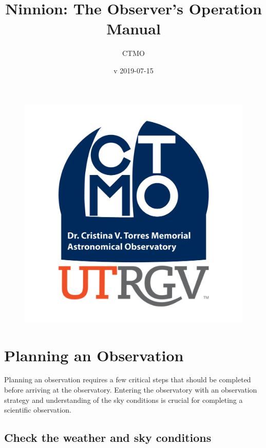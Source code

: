 \documentclass{article}
\title{Ninnion: The Observer's Operation Manual}
\author{CTMO}
\date{v 2019-07-15}
\begin{document}
	
	\maketitle
	
	\begin{figure}[b]
		\centering
		\includegraphics[scale=0.2]{CTMO_transparent.png}
	\end{figure}
	
	\newpage
	\tableofcontents
	
	\newpage
	\section{Planning an Observation}
	
		Planning an observation requires a few critical steps that should be completed before arriving at the observatory. Entering the observatory with an observation strategy and understanding of the sky conditions is crucial for completing a scientific observation.
	
		\subsection{Check the weather and sky conditions}
	
\end{document}
